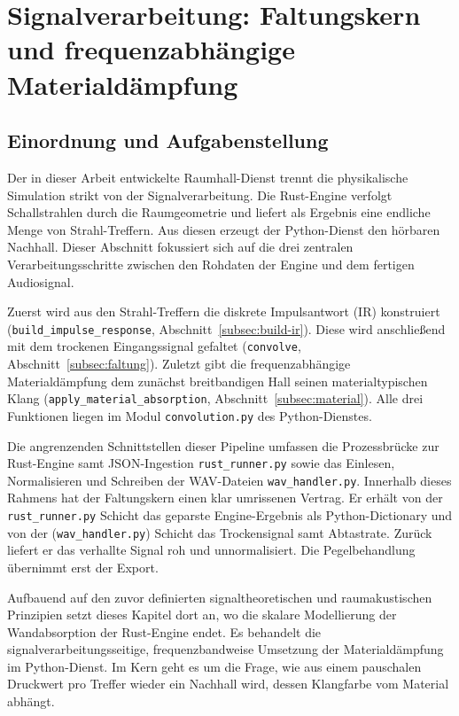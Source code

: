 


\section{Signalverarbeitung: Faltungskern und frequenzabhängige Materialdämpfung}
\label{sec:python-dsp}

\subsection{Einordnung und Aufgabenstellung}
\label{subsec:dsp-einordnung}

Der in dieser Arbeit entwickelte Raumhall-Dienst trennt die physikalische
Simulation strikt von der Signalverarbeitung. Die Rust-Engine verfolgt
Schallstrahlen durch die Raumgeometrie und liefert als Ergebnis eine endliche
Menge von Strahl-Treffern. Aus diesen erzeugt der Python-Dienst den hörbaren
Nachhall.
Dieser Abschnitt fokussiert sich auf die drei zentralen Verarbeitungsschritte zwischen den Rohdaten der Engine und dem fertigen Audiosignal.

Zuerst wird aus den Strahl-Treffern die diskrete Impulsantwort (IR)
konstruiert (\texttt{build\_impulse\_response},
Abschnitt~\ref{subsec:build-ir}). Diese wird anschließend mit dem trockenen
Eingangssignal gefaltet (\texttt{convolve}, Abschnitt~\ref{subsec:faltung}).
Zuletzt gibt die frequenzabhängige Materialdämpfung dem zunächst breitbandigen
Hall seinen materialtypischen Klang (\texttt{apply\_material\_absorption},
Abschnitt~\ref{subsec:material}). Alle drei Funktionen liegen im Modul
\texttt{convolution.py} des Python-Dienstes.


Die angrenzenden Schnittstellen dieser Pipeline umfassen die Prozessbrücke zur Rust-Engine samt JSON-Ingestion \texttt{rust\_runner.py}
sowie das Einlesen, Normalisieren und Schreiben der WAV-Dateien \texttt{wav\_handler.py}.
Innerhalb dieses Rahmens hat der Faltungskern einen klar
umrissenen Vertrag. Er erhält von der \texttt{rust\_runner.py} Schicht das geparste
Engine-Ergebnis als Python-Dictionary und von der (\texttt{wav\_handler.py}) Schicht das Trockensignal
samt Abtastrate. Zurück liefert er das verhallte Signal roh und
unnormalisiert. Die Pegelbehandlung übernimmt erst der Export.


Aufbauend auf den zuvor definierten signaltheoretischen und raumakustischen Prinzipien setzt dieses Kapitel dort an,
wo die skalare Modellierung der Wandabsorption der Rust-Engine endet.
Es behandelt die signalverarbeitungsseitige,
frequenzbandweise Umsetzung der Materialdämpfung im Python-Dienst. Im Kern geht
es um die Frage, wie aus einem pauschalen Druckwert pro Treffer wieder ein
Nachhall wird, dessen Klangfarbe vom Material abhängt.

